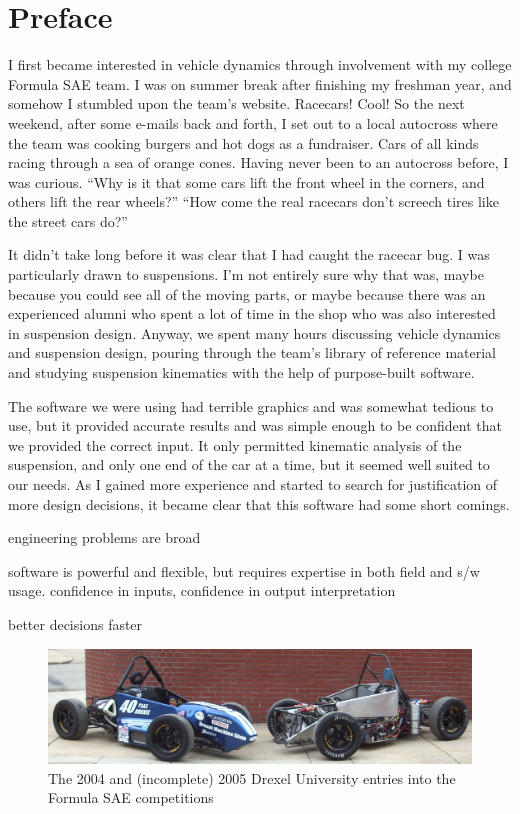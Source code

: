 \chapter{Preface}

I first became interested in vehicle dynamics through involvement with my college Formula SAE team.  I was on summer break after finishing my freshman year, and somehow I stumbled upon the team's website.  Racecars!  Cool!  So the next weekend, after some e-mails back and forth, I set out to a local autocross where the team was cooking burgers and hot dogs as a fundraiser.  Cars of all kinds racing through a sea of orange cones.  Having never been to an autocross before, I was curious.  ``Why is it that some cars lift the front wheel in the corners, and others lift the rear wheels?''  ``How come the real racecars don't screech tires like the street cars do?''

It didn't take long before it was clear that I had caught the racecar bug.  I was particularly drawn to suspensions.  I'm not entirely sure why that was, maybe because you could see all of the moving parts, or maybe because there was an experienced alumni who spent a lot of time in the shop who was also interested in suspension design.  Anyway, we spent many hours discussing vehicle dynamics and suspension design, pouring through the team's library of reference material and studying suspension kinematics with the help of purpose-built software.

The software we were using had terrible graphics and was somewhat tedious to use, but it provided accurate results and was simple enough to be confident that we provided the correct input.  It only permitted kinematic analysis of the suspension, and only one end of the car at a time, but it seemed well suited to our needs.  As I gained more experience and started to search for justification of more design decisions, it became clear that this software had some short comings.



engineering problems are broad

software is powerful and flexible, but requires expertise in both field and s/w usage.  confidence in inputs, confidence in output interpretation

better decisions faster

\begin{figure}
\includegraphics[width=\textwidth]{images/04-05cars}
\caption{The 2004 and (incomplete) 2005 Drexel University entries into the Formula SAE competitions}
\centering
\end{figure}
